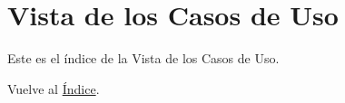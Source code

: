 \newpage
\section{Vista de los Casos de Uso}
Este es el índice de la Vista de los Casos de Uso.

Vuelve al \hyperlink{toc}{Índice}.
